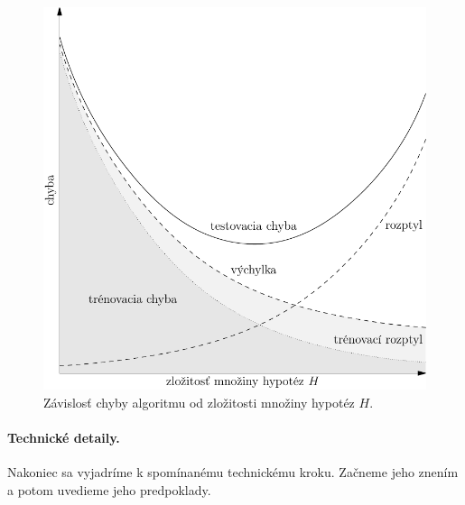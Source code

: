 \begin{figure}
  \centering
  \includegraphics[scale=0.8]{obrazky/krivky2.pdf}
  \caption{Závislosť chyby algoritmu od zložitosti množiny hypotéz $H$.}
  \label{img:hypo}
\end{figure}


\paragraph{Technické detaily.} \label{tradeoff:tech}
Nakoniec sa vyjadríme k spomínanému technickému kroku. Začneme jeho
znením a potom uvedieme jeho predpoklady.

